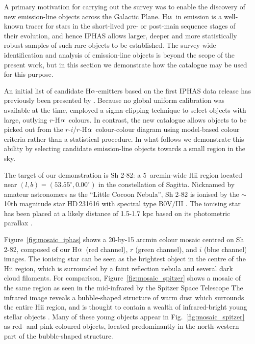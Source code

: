 \documentclass[useAMS,usenatbib]{mn2e}
\def\ha{\mbox{H$\rm \alpha$}}
\begin{document}
A primary motivation for carrying out the survey 
was to enable the discovery 
of new emission-line objects
across the Galactic Plane.
\ha\ in emission is a well-known tracer
for stars in the short-lived pre- or
post-main sequence stages of their evolution,
and hence IPHAS allows larger, deeper
and more statistically robust samples
of such rare objects to be established.
The survey-wide identification and analysis 
of emission-line objects is beyond the scope
of the present work,
but in this section we demonstrate how the
catalogue may be used for this purpose.

An initial list of candidate \ha-emitters
based on the first IPHAS data release has previously
been presented by \cite{Witham2008}. 
Because no global uniform calibration was available
at the time, \citeauthor{Witham2008} employed 
a sigma-clipping technique to select objects with
large, outlying $r$-\ha\ colours.
In contrast, the new catalogue
allows objects to be picked out
from the $r$-$i$/$r$-\ha\ colour-colour diagram
using model-based colour criteria
rather than a statistical procedure.
In what follows we demonstrate this ability 
by selecting candidate emission-line objects
towards a small region in the sky.

The target of our demonstration is Sh 2-82:
a 5~arcmin-wide H{\sc ii} region located near $(l,b)=(53.55^\circ, 0.00^\circ)$
in the constellation of Sagitta.
Nicknamed by amateur astronomers as the ``Little Cocoon Nebula'',
Sh 2-82 is ionised by 
the $\sim$10th magnitude star HD\,231616
with spectral type B0V/III
\citep{Georgelin1973,Mayer1973,Hunter1990}.
The ionising star has been placed 
at a likely distance of 1.5-1.7 kpc
based on its photometric parallax
\citep{Mayer1973,Lahulla1985,Hunter1990}.

Figure~\ref{fig:mosaic_iphas} shows a 20-by-15 arcmin
colour mosaic centred on Sh 2-82,
composed of our \ha\ (red channel),
$r$ (green channel),
and $i$ (blue channel) images.
The ionising star can be seen as the brightest object
in the centre of the H{\sc ii} region,
which is surrounded by a faint reflection nebula
and several dark cloud filaments.
For comparison, Figure~\ref{fig:mosaic_spitzer} shows
a mosaic of the same region 
as seen in the mid-infrared by the Spitzer Space Telescope
The infrared image reveals a bubble-shaped structure
of warm dust which surrounds the entire H{\sc ii} region,
and is thought to contain a wealth of infrared-bright
young stellar objects \citep{Yu2012}.
Many of these young objects 
appear in Fig.~\ref{fig:mosaic_spitzer}
as red- and pink-coloured objects,
located predominantly in the north-western part
of the bubble-shaped structure.
\end{document}
